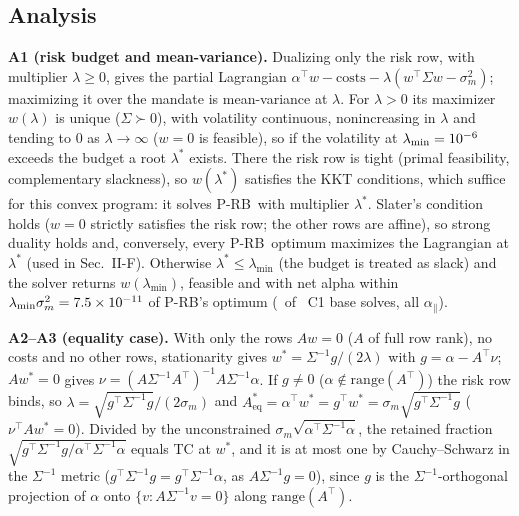 \documentclass[conference]{IEEEtran}
\newcommand{\T}{^{\top}}
\newcommand{\prb}{\mbox{P-RB}}
\begin{document}
\subsection{Analysis}
\textbf{A1 (risk budget and mean-variance).} Dualizing only the risk row, with multiplier $\lambda\ge0$, gives the partial Lagrangian $\alpha\T w-\text{costs}-\lambda(w\T\Sigma w-\sigma_m^2)$; maximizing it over the mandate is mean-variance at $\lambda$. For $\lambda>0$ its maximizer $w(\lambda)$ is unique ($\Sigma\succ0$), with volatility continuous, nonincreasing in $\lambda$ and tending to 0 as $\lambda\to\infty$ ($w=0$ is feasible), so if the volatility at $\lambda_{\min}=10^{-6}$ exceeds the budget a root $\lambda^*$ exists. There the risk row is tight (primal feasibility, complementary slackness), so $w(\lambda^*)$ satisfies the KKT conditions, which suffice for this convex program: it solves \prb\ with multiplier $\lambda^*$. Slater's condition holds ($w=0$ strictly satisfies the risk row; the other rows are affine), so strong duality holds and, conversely, every \prb\ optimum maximizes the Lagrangian at $\lambda^*$ (used in Sec.~II-F). Otherwise $\lambda^*\le\lambda_{\min}$ (the budget is treated as slack) and the solver returns $w(\lambda_{\min})$, feasible and with net alpha within $\lambda_{\min}\sigma_m^2=7.5\times10^{-11}$ of \prb's optimum (\CSlack\ of \CNPoints\ C1 base solves, all $\alpha_\parallel$).

\textbf{A2--A3 (equality case).} With only the rows $Aw=0$ ($A$ of full row rank), no costs and no other rows, stationarity gives $w^*=\Sigma^{-1}g/(2\lambda)$ with $g=\alpha-A\T\nu$; $Aw^*=0$ gives $\nu=(A\Sigma^{-1}A\T)^{-1}A\Sigma^{-1}\alpha$. If $g\ne0$ ($\alpha\notin\mathrm{range}(A\T)$) the risk row binds, so $\lambda=\sqrt{g\T\Sigma^{-1}g}/(2\sigma_m)$ and $A^*_{\mathrm{eq}}=\alpha\T w^*=g\T w^*=\sigma_m\sqrt{g\T\Sigma^{-1}g}$ ($\nu\T Aw^*=0$). Divided by the unconstrained $\sigma_m\sqrt{\alpha\T\Sigma^{-1}\alpha}$, the retained fraction $\sqrt{g\T\Sigma^{-1}g/\alpha\T\Sigma^{-1}\alpha}$ equals TC at $w^*$, and it is at most one by Cauchy--Schwarz in the $\Sigma^{-1}$ metric ($g\T\Sigma^{-1}g=g\T\Sigma^{-1}\alpha$, as $A\Sigma^{-1}g=0$), since $g$ is the $\Sigma^{-1}$-orthogonal projection of $\alpha$ onto $\{v:A\Sigma^{-1}v=0\}$ along $\mathrm{range}(A\T)$.
\end{document}
